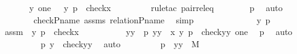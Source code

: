 \begin{isabellebody}
\ \isamarkupfalse%
\ {\isachardoublequoteopen}{\isachardot}{\kern0pt}{\isachardot}{\kern0pt}{\isachardot}{\kern0pt}\ {\isacharequal}{\kern0pt}\ \ {\isacharbraceleft}{\kern0pt}\ {\isacharless}{\kern0pt}y{\isacharcomma}{\kern0pt}\ one{\isachargreater}{\kern0pt}\ {\isachardot}{\kern0pt}\ \ {\isacharless}{\kern0pt}y{\isacharcomma}{\kern0pt}\ p{\isachargreater}{\kern0pt}\ {\isasymin}\ check{\isacharparenleft}{\kern0pt}x{\isacharparenright}{\kern0pt}\ {\isacharbraceright}{\kern0pt}{\isachardoublequoteclose}\isanewline
\ \ \ \ \ \ \isamarkupfalse%
\ {\isacharparenleft}{\kern0pt}rule{\isacharunderscore}{\kern0pt}tac\ pair{\isacharunderscore}{\kern0pt}rel{\isacharunderscore}{\kern0pt}eq{\isacharparenright}{\kern0pt}\isanewline
\ \ \ \ \ \ \isamarkupfalse%
\ p{}\ \isamarkupfalse%
\ auto\ \isanewline
\ \ \ \ \ \ \isamarkupfalse%
\ check{\isacharunderscore}{\kern0pt}P{\isacharunderscore}{\kern0pt}name\ assms\ relation{\isacharunderscore}{\kern0pt}P{\isacharunderscore}{\kern0pt}name\ \isamarkupfalse%
\ simp\isanewline
\ \ \ \ \isamarkupfalse%
\ {\isacharminus}{\kern0pt}\isanewline
\ \ \ \ \ \ \isamarkupfalse%
\ y\ p\ \isamarkupfalse%
\ assm{}{\isacharcolon}{\kern0pt}\ \ {\isachardoublequoteopen}{\isasymlangle}y{\isacharcomma}{\kern0pt}\ p{\isasymrangle}\ {\isasymin}\ check{\isacharparenleft}{\kern0pt}x{\isacharparenright}{\kern0pt}{\isachardoublequoteclose}\ \isanewline
\ \ \ \ \ \ \isamarkupfalse%
\ \isamarkupfalse%
\ yy\ \ p{}{\isacharcolon}{\kern0pt}\ {\isachardoublequoteopen}yy\ {\isasymin}\ x{\isachardoublequoteclose}\ {\isachardoublequoteopen}{\isacharless}{\kern0pt}y{\isacharcomma}{\kern0pt}\ p{\isachargreater}{\kern0pt}\ {\isacharequal}{\kern0pt}\ {\isacharless}{\kern0pt}check{\isacharparenleft}{\kern0pt}yy{\isacharparenright}{\kern0pt}{\isacharcomma}{\kern0pt}\ one{\isachargreater}{\kern0pt}{\isachardoublequoteclose}\ \isamarkupfalse%
\ p{}\ \isamarkupfalse%
\ auto\ \isanewline
\ \ \ \ \ \ \isamarkupfalse%
\ \isamarkupfalse%
\ p{}{\isacharcolon}{\kern0pt}\ {\isachardoublequoteopen}y\ {\isacharequal}{\kern0pt}\ check{\isacharparenleft}{\kern0pt}yy{\isacharparenright}{\kern0pt}{\isachardoublequoteclose}\ \isamarkupfalse%
\ auto\ \isanewline
\ \ \ \ \ \ \isamarkupfalse%
\ p{}\ {\isacharcolon}{\kern0pt}\ {\isachardoublequoteopen}yy\ {\isasymin}\ M{\isachardoublequoteclose}\ \isamarkupfalse%

\end{isabellebody}
